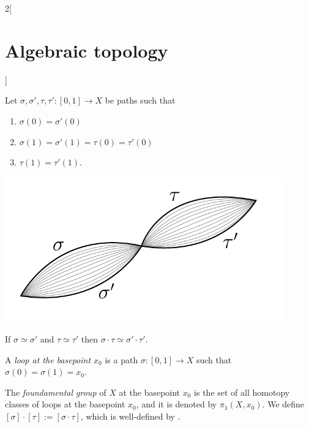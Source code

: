 \documentclass[../../../main_math.tex]{subfiles}
\begin{document}
\begin{multicols}{2}[\section{Algebraic topology}]
\begin{definition}
  \end{definition}

  \begin{lemma}\label{ProdCamins}
    Let $\sigma, \sigma', \tau, \tau':[0,1]\to X$ be paths such that

    \begin{minipage}{0.29\textwidth}

      \begin{enumerate}
        \item $\sigma(0)=\sigma'(0)$
        \item $\sigma(1)=\sigma'(1)=\tau(0)=\tau'(0)$
        \item $\tau(1)=\tau'(1)$.
      \end{enumerate}
    \end{minipage}
    \begin{minipage}{0.21\textwidth}
      \begin{flushright}
        \includegraphics[width=0.9\textwidth]{Images/Camins.pdf}
      \end{flushright}
    \end{minipage}

    \vspace{0.1cm}
    If $\sigma \simeq \sigma'$ and $\tau \simeq \tau'$ then $\sigma \cdot \tau \simeq \sigma' \cdot \tau'$.
  \end{lemma}

  \begin{definition}
    A \emph{loop at the basepoint $x_0$} is a path $\sigma: [0,1]\to X$ such that $\sigma(0)=\sigma(1)=x_0$.
  \end{definition}

  \begin{definition}
    The \emph{foundamental group} of $X$ at the basepoint $x_0$ is the set of all homotopy classes of loops at the basepoint $x_0$, and it is denoted by $\pi_1 (X,x_0)$. We define $[\sigma]\cdot [\tau]:=[\sigma \cdot \tau]$, which is well-defined by .
  \end{definition}


\end{multicols}
\end{document}

